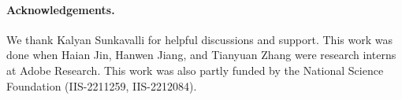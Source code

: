 \documentclass{article} %
\begin{document}
\paragraph{Acknowledgements.} We thank Kalyan Sunkavalli for helpful discussions and support. This work was done when Haian Jin, Hanwen Jiang, and Tianyuan Zhang were research interns at Adobe Research.  This work was also partly funded by the National Science Foundation (IIS-2211259, IIS-2212084).



\clearpage
\appendix


\end{document}

